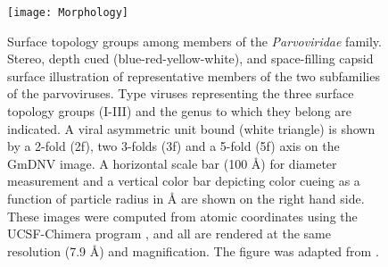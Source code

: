 \begin{figure}[h] 
\centering
\texttt{[image: Morphology]}
\caption[Parvovirus surface topology groups]{Surface topology groups among members of the \textit{Parvoviridae} family. Stereo, depth cued (blue-red-yellow-white), and space-filling capsid surface illustration of representative members of the two subfamilies of the parvoviruses. Type viruses representing the three surface topology groups (I-III) and the genus to which they belong are indicated. A viral asymmetric unit bound (white triangle) is shown by a 2-fold (2f), two 3-folds (3f) and a 5-fold (5f) axis on the GmDNV image. A horizontal scale bar (100 \r{A}) for diameter measurement and a vertical color bar depicting color cueing as a function of particle radius in \r{A} are shown on the right hand side. These images were computed from atomic coordinates using the UCSF-Chimera program \cite{pmid15264254}, and all are rendered at the same resolution (7.9 \r{A}) and magnification. The figure was adapted from \cite{pmid20375175}.}
\label{Morphology}
\end{figure}



